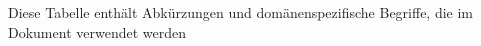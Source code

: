Diese Tabelle enthält Abkürzungen und domänenspezifische Begriffe, die im Dokument verwendet werden
